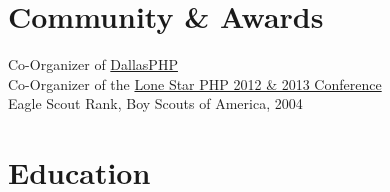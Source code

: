 \documentclass{resume}
\begin{document}
\section{Community \& Awards}

Co-Organizer of \href{http://www.meetup.com/dallasphp/}{DallasPHP}
\\
Co-Organizer of the \href{http://lonestarphp.com/}{Lone Star PHP 2012 \& 2013 Conference}
\\
Eagle Scout Rank, Boy Scouts of America, 2004

\section{Education}

\end{document}
